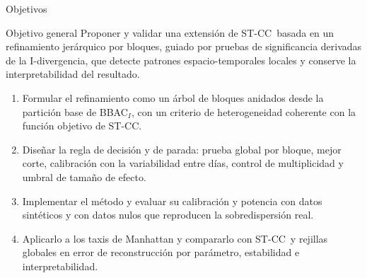 \documentclass[aspectratio=169,10pt,t]{beamer}
\newcommand{\BBAC}{BBAC$_I$}
\newcommand{\STCC}{ST-CC}
\begin{document}
\begin{frame}{Objetivos}
  \begin{block}{Objetivo general}
    \small Proponer y validar una extensión de \STCC\ basada en un \alert{refinamiento jerárquico por
    bloques}, guiado por pruebas de significancia derivadas de la I-divergencia, que detecte patrones
    espacio-temporales locales y conserve la interpretabilidad del resultado.
  \end{block}
  \vspace{0.6ex}
  \small
  \begin{enumerate}
    \setlength{\itemsep}{0.9ex}
    \item[\textbf{OE1}] Formular el refinamiento como un árbol de bloques anidados desde la partición
          base de \BBAC, con un criterio de heterogeneidad coherente con la función objetivo de \STCC.
    \item[\textbf{OE2}] Diseñar la regla de decisión y de parada: prueba global por bloque, mejor corte,
          calibración con la variabilidad entre días, control de multiplicidad y umbral de tamaño de efecto.
    \item[\textbf{OE3}] Implementar el método y evaluar su calibración y potencia con datos sintéticos y con
          datos nulos que reproducen la sobredispersión real.
    \item[\textbf{OE4}] Aplicarlo a los taxis de Manhattan y compararlo con \STCC\ y rejillas globales en
          error de reconstrucción por parámetro, estabilidad e interpretabilidad.
  \end{enumerate}
\end{frame}
\end{document}
